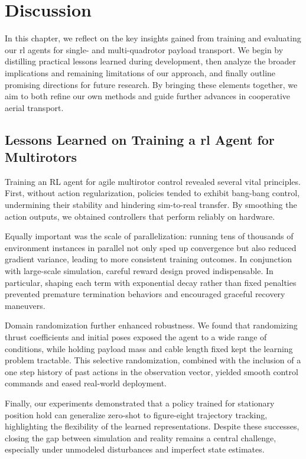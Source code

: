 \chapter{Discussion}

In this chapter, we reflect on the key insights gained from training and evaluating our \gls{rl} agents for single- and multi-quadrotor payload transport. We begin by distilling practical lessons learned during development, then analyze the broader implications and remaining limitations of our approach, and finally outline promising directions for future research. By bringing these elements together, we aim to both refine our own methods and guide further advances in cooperative aerial transport.

\section{Lessons Learned on Training a \gls{rl} Agent for Multirotors}

Training an RL agent for agile multirotor control revealed several vital principles.  First, without action regularization, policies tended to exhibit bang-bang control, undermining their stability and hindering sim-to-real transfer.  By smoothing the action outputs, we obtained controllers that perform reliably on hardware.

Equally important was the scale of parallelization: running tens of thousands of environment instances in parallel not only sped up convergence but also reduced gradient variance, leading to more consistent training outcomes.  In conjunction with large-scale simulation, careful reward design proved indispensable.  In particular, shaping each term with exponential decay rather than fixed penalties prevented premature termination behaviors and encouraged graceful recovery maneuvers.

Domain randomization further enhanced robustness.  We found that randomizing thrust coefficients and initial poses exposed the agent to a wide range of conditions, while holding payload mass and cable length fixed kept the learning problem tractable.  This selective randomization, combined with the inclusion of a one step history of past actions in the observation vector, yielded smooth control commands and eased real-world deployment.

Finally, our experiments demonstrated that a policy trained for stationary position hold can generalize zero-shot to figure-eight trajectory tracking, highlighting the flexibility of the learned representations.  Despite these successes, closing the gap between simulation and reality remains a central challenge, especially under unmodeled disturbances and imperfect state estimates.

